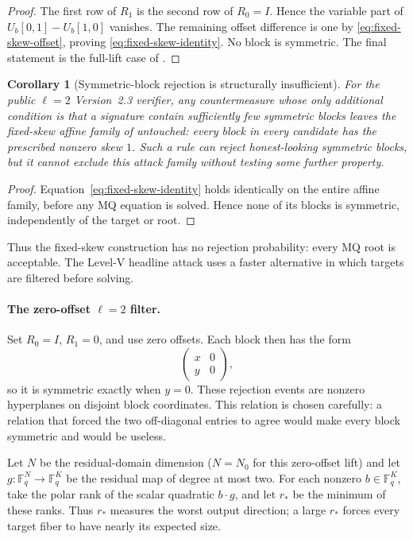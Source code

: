 \documentclass[11pt]{article}
\newtheorem{corollary}[corollary]{Corollary}
\newcommand{\F}{\mathbb F}
\begin{document}
\begin{proof}
The first row of $R_1$ is the second row of $R_0=I$.  Hence the variable part
of $U_b[0,1]-U_b[1,0]$ vanishes.  The remaining offset difference is one by
\eqref{eq:fixed-skew-offset}, proving \eqref{eq:fixed-skew-identity}.  No block
is symmetric.  The final statement is the full-lift case of
.
\end{proof}

\begin{corollary}[Symmetric-block rejection is structurally insufficient]
\label{cor:symmetry-rejection-insufficient}
For the public $\ell=2$ Version~2.3 verifier, any countermeasure whose only
additional condition is that a signature contain sufficiently few symmetric
blocks leaves the fixed-skew affine family of
 untouched: every block in every candidate has the
prescribed nonzero skew $1$.  Such a rule can reject honest-looking symmetric
blocks, but it cannot exclude this attack family without testing some further
property.
\end{corollary}

\begin{proof}
Equation~\eqref{eq:fixed-skew-identity} holds identically on the entire affine
family, before any MQ equation is solved.  Hence none of its blocks is
symmetric, independently of the target or root.
\end{proof}

Thus the fixed-skew construction has no rejection probability: every MQ root
is acceptable.  The Level-V headline attack uses a faster alternative in which
targets are filtered before solving.

\paragraph{The zero-offset $\ell=2$ filter.}
Set $R_0=I$, $R_1=0$, and use zero offsets.  Each block then has the form
\[
 \begin{pmatrix}x&0\\ y&0\end{pmatrix},
\]
so it is symmetric exactly when $y=0$.  These rejection events are nonzero
hyperplanes on disjoint block coordinates.  This relation is chosen
carefully: a relation that forced the two off-diagonal entries to agree would
make every block symmetric and would be useless.

Let $N$ be the residual-domain dimension ($N=N_0$ for this zero-offset lift)
and let $g:\F_q^N\to\F_q^K$ be the residual map of degree at most two.
For each nonzero
$b\in\F_q^K$, take the polar rank of the scalar quadratic $b\cdot g$, and let
$r_*$ be the minimum of these ranks.  Thus $r_*$ measures the worst output
direction; a large $r_*$ forces every target fiber to have nearly its expected
size.
\end{document}
